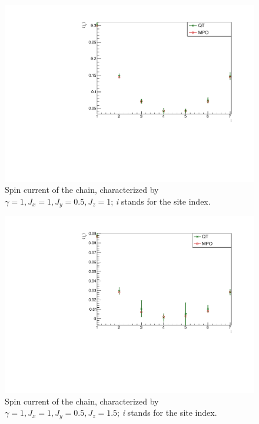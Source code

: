 \begin{figure}[H]
    \centering
    \includegraphics[scale=0.7]{Figures/8sites/SpinCurr_8s_J1051.pdf}
    \caption{Spin current of the chain, characterized by $\gamma=1, J_x=1, J_y=0.5, J_z=1$; \emph{i} stands for the site index.}
    \label{fig:my_label}
\end{figure}

\begin{figure}[H]
    \centering
    \includegraphics[scale=0.7]{Figures/8sites/SpinCurr_8s_J10515.pdf}
    \caption{Spin current of the chain, characterized by $\gamma=1, J_x=1, J_y=0.5, J_z=1.5$; \emph{i} stands for the site index.}
    \label{fig:my_label}
\end{figure}

